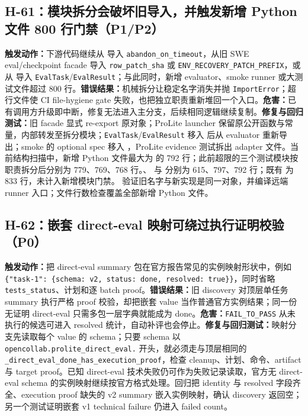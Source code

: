 \documentclass[11pt,a4paper,fontset=fandol]{ctexart}
\newcommand{\code}[1]{\texttt{#1}}
\begin{document}
\subsection{H-61：模块拆分会破坏旧导入，并触发新增 Python 文件 800 行门禁（P1/P2）}

\textbf{触发动作：}下游代码继续从  导入 \code{abandon\_on\_timeout}，从旧 SWE eval/checkpoint facade 导入 \code{row\_patch\_sha} 或 \code{ENV\_RECOVERY\_PATCH\_PREFIX}，或从  导入 \code{EvalTask}/\code{EvalResult}；与此同时，新增 evaluator、smoke runner 或大测试文件超过 800 行。\textbf{错误结果：}机械拆分让稳定名字消失并抛 \code{ImportError}；超行文件使 CI file-hygiene gate 失败，也把独立职责重新堆回一个入口。\textbf{危害：}已有调用方升级即中断，修复无法进入主分支，后续相同逻辑继续复制。\textbf{修复与回归测试：}旧 facade 显式 re-export 原对象；ProLite launcher 保留原公开函数与常量，内部转发至拆分模块；\code{EvalTask}/\code{EvalResult} 移入  后从 evaluator 重新导出；smoke 的 optional spec 移入 ，ProLite evidence 测试拆出 adapter 文件。当前结构扫描中，新增 Python 文件最大为  的 792 行；此前超限的三个测试模块按职责拆分后分别为 779、769、768 行。、 与  分别为 615、797、792 行；既有  为 833 行，未计入新增模块门禁。 验证旧名字与新实现是同一对象，并编译远端 runner 入口；文件行数检查覆盖全部新增 Python 文件。

\subsection{H-62：嵌套 direct-eval 映射可绕过执行证明校验（P0）}

\textbf{触发动作：}把 direct-eval summary 包在官方报告常见的实例映射形状中，例如 \code{\{"task-1": \{schema: v2, status: done, resolved: true\}\}}，同时省略 \code{tests\_status}、计划和逐 batch proof。\textbf{错误结果：}旧 discovery 对顶层单任务 summary 执行严格 proof 校验，却把嵌套 value 当作普通官方实例结果；同一份无证明 direct-eval 只需多包一层字典就能成为 done。\textbf{危害：}\code{FAIL\_TO\_PASS} 从未执行的候选可进入 resolved 统计，自动补评也会停止。\textbf{修复与回归测试：}映射分支先读取每个 value 的 schema；只要 schema 以 \code{opencollab.prolite\_direct\_eval.} 开头，就必须走与顶层相同的 \code{\_direct\_eval\_done\_has\_execution\_proof}，检查 cleanup、计划、命令、artifact 与 target proof。已知 direct-eval 技术失败仍可作为失败记录读取，官方无 direct-eval schema 的实例映射继续按官方格式处理。回归把 identity 与 resolved 字段齐全、execution proof 缺失的 v2 summary 嵌入实例映射，确认 discovery 返回空；另一个测试证明嵌套 v1 technical failure 仍进入 failed count。
\end{document}
